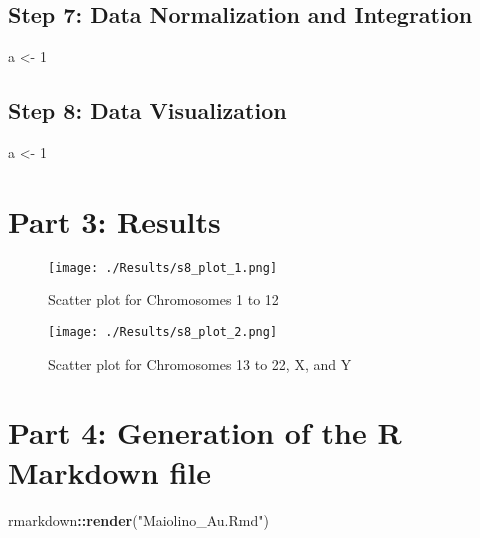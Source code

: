 \documentclass[]{article}
\newenvironment{Shaded}{\begin{snugshade}}{\end{snugshade}}
\newcommand{\DecValTok}[1]{\textcolor[rgb]{0.00,0.00,0.81}{#1}}
\newcommand{\KeywordTok}[1]{\textcolor[rgb]{0.13,0.29,0.53}{\textbf{#1}}}
\newcommand{\NormalTok}[1]{#1}
\newcommand{\OperatorTok}[1]{\textcolor[rgb]{0.81,0.36,0.00}{\textbf{#1}}}
\newcommand{\StringTok}[1]{\textcolor[rgb]{0.31,0.60,0.02}{#1}}
\begin{document}
\hypertarget{step-7-data-normalization-and-integration}{%
\subsection{Step 7: Data Normalization and
Integration}\label{step-7-data-normalization-and-integration}}

\begin{Shaded}
\begin{Highlighting}[]
\NormalTok{a <-}\StringTok{ }\DecValTok{1}
\end{Highlighting}
\end{Shaded}

\hypertarget{step-8-data-visualization}{%
\subsection{Step 8: Data
Visualization}\label{step-8-data-visualization}}

\begin{Shaded}
\begin{Highlighting}[]
\NormalTok{a <-}\StringTok{ }\DecValTok{1}
\end{Highlighting}
\end{Shaded}

\newpage

\hypertarget{part-3-results}{%
\section{Part 3: Results}\label{part-3-results}}

\begin{figure}
\centering
\texttt{[image: ./Results/s8\_plot\_1.png]}
\caption{Scatter plot for Chromosomes 1 to 12}
\end{figure}

\newpage

\begin{figure}
\centering
\texttt{[image: ./Results/s8\_plot\_2.png]}
\caption{Scatter plot for Chromosomes 13 to 22, X, and Y}
\end{figure}

\newpage

\hypertarget{part-4-generation-of-the-r-markdown-file}{%
\section{Part 4: Generation of the R Markdown
file}\label{part-4-generation-of-the-r-markdown-file}}

\begin{Shaded}
\begin{Highlighting}[]
\NormalTok{rmarkdown}\OperatorTok{::}\KeywordTok{render}\NormalTok{(}\StringTok{"Maiolino_Au.Rmd"}\NormalTok{)}
\end{Highlighting}
\end{Shaded}
\end{document}
